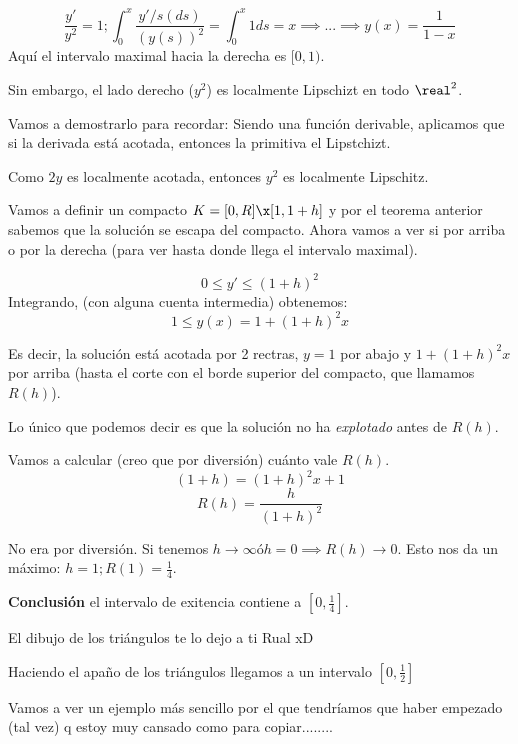\documentclass[nochap]{apuntes}
\begin{document}
\[\frac{y'}{y^2} = 1 ; \int_0^x \frac{y'/s(ds)}{(y(s))^2} = \int_0^x 1ds = x \implies ... \implies y(x) = \frac{1}{1-x}\]
Aquí el intervalo maximal hacia la derecha es $[0,1)$.

Sin embargo, el lado derecho ($y^2$) es localmente Lipschizt en todo $\real^2$.

Vamos a demostrarlo para recordar: Siendo una función derivable, aplicamos que si la derivada está acotada, entonces la primitiva el Lipstchizt. 

Como $2y$ es localmente acotada, entonces $y^2$ es localmente Lipschitz.

Vamos a definir un compacto $K = [0,R]\x[1,1+h]$ y por el teorema anterior sabemos que la solución se escapa del compacto. Ahora vamos a ver si por arriba o por la derecha (para ver hasta donde llega el intervalo maximal).

\[0\leq y' \leq (1+h)^2\]
Integrando, (con alguna cuenta intermedia) obtenemos:
\[1\leq y (x) = 1 + (1+h)^2 x\]

Es decir, la solución está acotada por 2 rectras, $y=1$ por abajo y $1 + (1+h)^2 x$ por arriba (hasta el corte con el borde superior del compacto, que llamamos $R(h)$).

Lo único que podemos decir es que la solución no ha \textit{explotado} antes de $R(h)$.

Vamos a calcular (creo que por diversión) cuánto vale $R(h)$.
\[(1+h) = (1+h)^2x+1\]
\[R(h) = \frac{h}{(1+h)^2}\]


No era por diversión. Si tenemos $h\to \infty ó h=0 \implies R(h) \to 0$. Esto nos da un máximo: $h=1; R(1)=\frac{1}{4}$.

\textbf{Conclusión} el intervalo de exitencia contiene a $\left[0,\frac{1}{4}\right]$.

El dibujo de los triángulos te lo dejo a ti Rual xD

Haciendo el apaño de los triángulos llegamos a un intervalo $\left[0,\frac{1}{2}\right]$

Vamos a ver un ejemplo más sencillo por el que tendríamos que haber empezado (tal vez) q estoy muy cansado como para copiar........

\end{document}
